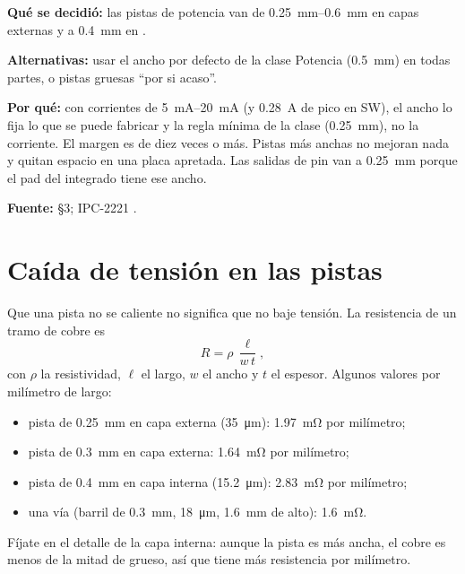 \begin{decision}
\textbf{Qué se decidió:} las pistas de potencia van de \SIrange{0.25}{0.6}{\milli\meter} en capas externas y a
\SI{0.4}{\milli\meter} en .\par
\textbf{Alternativas:} usar el ancho por defecto de la clase Potencia (\SI{0.5}{\milli\meter}) en todas partes, o
pistas gruesas ``por si acaso''.\par
\textbf{Por qué:} con corrientes de \SIrange{5}{20}{\milli\ampere} (y \SI{0.28}{\ampere} de pico en SW), el ancho lo
fija lo que se puede fabricar y la regla mínima de la clase (\SI{0.25}{\milli\meter}), no la corriente. El margen es
de diez veces o más. Pistas más anchas no mejoran nada y quitan espacio en una placa apretada. Las salidas de pin van a
\SI{0.25}{\milli\meter} porque el pad del integrado tiene ese ancho.\par
\textbf{Fuente:}  §3; IPC-2221 \copia.
\end{decision}

\section{Caída de tensión en las pistas}\label{sec:c10-caida}

Que una pista no se caliente no significa que no baje tensión. La resistencia de un tramo de cobre es
\begin{equation}\label{eq:c10-r}
R = \rho\,\frac{\ell}{w\,t},
\end{equation}
con $\rho$ la resistividad, $\ell$ el largo, $w$ el ancho y $t$ el espesor. Algunos valores por milímetro de largo:

\begin{itemize}
  \item pista de \SI{0.25}{\milli\meter} en capa externa (\SI{35}{\micro\meter}): \SI{1.97}{\milli\ohm} por milímetro;
  \item pista de \SI{0.3}{\milli\meter} en capa externa: \SI{1.64}{\milli\ohm} por milímetro;
  \item pista de \SI{0.4}{\milli\meter} en capa interna (\SI{15.2}{\micro\meter}): \SI{2.83}{\milli\ohm} por milímetro;
  \item una vía (barril de \SI{0.3}{\milli\meter}, \SI{18}{\micro\meter}, \SI{1.6}{\milli\meter} de alto): \SI{1.6}{\milli\ohm}.
\end{itemize}

Fíjate en el detalle de la capa interna: aunque la pista es más ancha, el cobre es menos de la mitad de grueso, así que
tiene más resistencia por milímetro.

